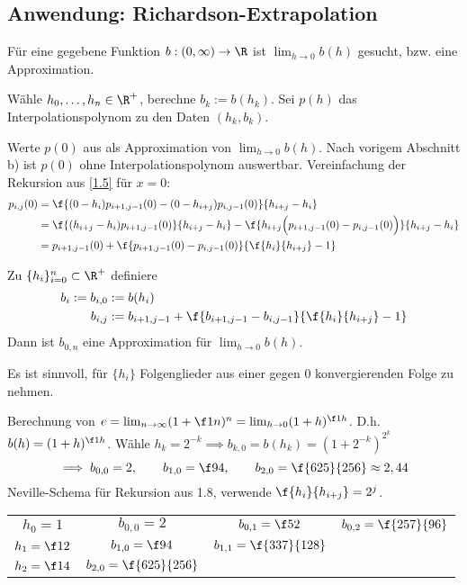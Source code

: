 \documentclass[11pt]{scrbook}
\begin{document}
\subsection{Anwendung: Richardson-Extrapolation}

Für eine gegebene Funktion $b:(0,\infty)\to \R$ ist $\lim_{h\to 0} b(h)$ gesucht, bzw. eine Approximation.

\begin{seg}[Ansatz:]
Wähle $h_0,\dotsc, h_n \in \R^+$, berechne $b_k := b(h_k)$.
Sei $p(h)$ das Interpolationspolynom zu den Daten $(h_k,b_k)$.

Werte $p(0)$ aus als Approximation von $\lim_{h\to 0} b(h)$.
Nach vorigem Abschnitt b) ist $p(0)$ ohne Interpolationspolynom auswertbar.
Vereinfachung der Rekursion aus \ref{1.5} für $x=0$:
\begin{align*}
	p_{i,j}(0) &= \f {(0-h_i)p_{i+1,j-1}(0) - (0-h_{i+j})p_{i,j-1}(0)}{h_{i+j}-h_i} \\
	&= \f {(h_{i+j}-h_i)p_{i+1,j-1}(0)}{h_{i+j}-h_i} - \f {h_{i+j}\Big(p_{i+1,j-1}(0)-p_{i,j-1}(0)\Big)}{h_{i+j}-h_i}\\
	&= p_{i+1,j-1}(0) + \f {p_{i+1,j-1}(0) -p_{i,j-1}(0)}{\f {h_i}{h_{i+j}} - 1}
\end{align*}
\end{seg}

\begin{df} \label{1.8}
	Zu $\{h_i\}_{i=0}^n \subset \R^+$ definiere
	\begin{align*}
		b_i := b_{i,0} &:= b(h_i)\\
		b_{i,j} &:= b_{i+1,j-1} + \f {b_{i+1,j-1}-b_{i,j-1}}{\f {h_i}{h_{i+j}}-1}
	\end{align*}
	Dann ist $b_{0,n}$ eine Approximation für $\lim_{h\to 0} b(h)$.
	\begin{note}
		Es ist sinnvoll, für $\{h_i\}$ Folgenglieder aus einer gegen 0 konvergierenden Folge zu nehmen.
	\end{note}
\end{df}

\begin{ex*}
	Berechnung von $e=\lim_{n\to \infty} (1 +\f 1n)^n = \lim_{h\to 0} (1+h)^{\f 1h}$.
	D.h. $b(h)=(1+h)^{\f 1h}$.
	Wähle $h_k=2^{-k} \implies b_{k,0}=b(h_k) = (1+2^{-k})^{2^k}$
	\[
		\implies b_{0,0} = 2, \qquad b_{1,0} = \f 94, \qquad b_{2,0} = \f {625}{256} \approx 2,44
	\]
	Neville-Schema für Rekursion aus 1.8, verwende $\f {h_i}{h_{i+j}} = 2^j$.
	\begin{table}[H]
		\centering
		\begin{tabular}{c|ccc}
			$h_0=1$ & $b_{0,0}=2$  & $b_{0,1}=\f 52$ & $b_{0,2}=\f {257}{96}$\\
			$h_1=\f12$ & $b_{1,0}=\f 94$  & $b_{1,1}=\f {337}{128}$ & \\
			$h_2=\f14$ & $b_{2,0}=\f {625}{256}$  \\
		\end{tabular}
	\end{table}
\end{ex*}
\end{document}
